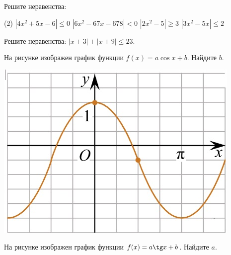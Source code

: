 \begin{homework}[number=3]
	\begin{listofex}
		\item Решите неравенства: %
		\begin{tasks}(2)
			\task \( |4x^2+5x-6| \le 0 \)
			\task \( |6x^2-67x-678| < 0 \)
			\task \( |2x^2-5| \ge 3 \)
			\task \( |3x^2-5x| \le 2 \)
		\end{tasks}
		\item Решите неравенства: \( |x+3|+|x+9| \le 23 \). %
		
		\item %
		\begin{minipage}[t]{\bodywidth}
			На рисунке изображен график функции \(f(x) =a \cos x +b\). Найдите \(b\).
		\end{minipage}
		\hspace{0.02\linewidth}
		\begin{minipage}[t]{\picwidth}
			\includegraphics[align=t, width=\linewidth]{../pics/MECGERM6H3-1.jpg}
		\end{minipage}
		\item %
		\begin{minipage}[t]{\bodywidth}
			На рисунке изображен график функции \(f(x) =a \tg x +b\). Найдите \(a\).
		\end{minipage}
		\hspace{0.02\linewidth}
		\begin{minipage}[t]{\picwidth}

\end{minipage}
\end{listofex}
\end{homework}
